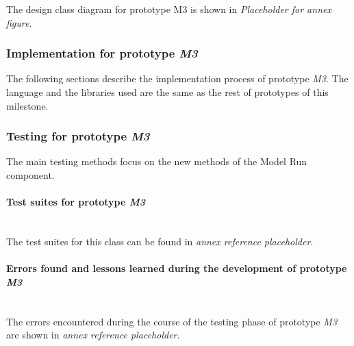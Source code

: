 The design class diagram for prototype M3 is shown in \emph{Placeholder for annex figure}.

\subsubsection{Implementation for prototype \emph{M3}}

The following sections describe the implementation process of prototype \emph{M3}. The language and the libraries used are the same as the rest of prototypes of this milestone.

\subsubsection{Testing for prototype \emph{M3}}

The main testing methods focus on the new methods of the Model Run component.

\paragraph{Test suites for prototype \emph{M3}}\mbox{}\\

The test suites for this class can be found in \emph{annex reference placeholder}.

\paragraph{Errors found and lessons learned during the development of prototype \emph{M3}}\mbox{}\\

The errors encountered during the course of the testing phase of prototype \emph{M3} are shown in \emph{annex reference placeholder}.
